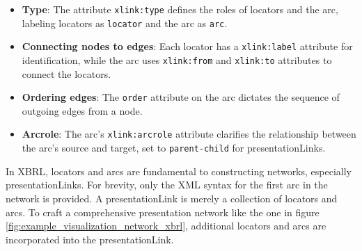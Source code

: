 \begin{itemize}
    \item \textbf{Type}: The attribute \texttt{xlink:type} defines the roles of locators and the arc, labeling locators as \texttt{locator} and the arc as \texttt{arc}.
    \item \textbf{Connecting nodes to edges}: Each locator has a \texttt{xlink:label} attribute for identification, while the arc uses \texttt{xlink:from} and \texttt{xlink:to} attributes to connect the locators.
    \item \textbf{Ordering edges}: The \texttt{order} attribute on the arc dictates the sequence of outgoing edges from a node.
    \item \textbf{Arcrole}: The arc's \texttt{xlink:arcrole} attribute clarifies the relationship between the arc's source and target, set to \texttt{parent-child} for presentationLinks.
\end{itemize}

In XBRL, locators and arcs are fundamental to constructing networks, especially presentationLinks.
For brevity, only the XML syntax for the first arc in the network is provided.
A presentationLink is merely a collection of locators and arcs.
To craft a comprehensive presentation network like the one in figure \ref{fig:example_visualization_network_xbrl}, additional locators and arcs are incorporated into the presentationLink.





